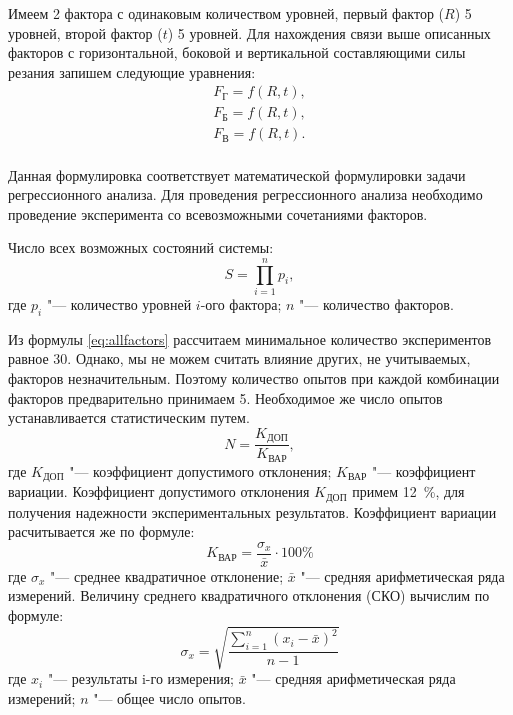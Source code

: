 Имеем 2 фактора с одинаковым количеством уровней, первый фактор ($R$) 5 уровней, второй фактор ($t$) 5 уровней. Для нахождения связи выше описанных факторов с горизонтальной, боковой и вертикальной составляющими силы резания запишем следующие уравнения:
\begin{equation}
\label{eq:regresF}
\begin{alignedat}{2}
	F_\text{Г}=f(R,t),\\
	F_\text{Б}=f(R,t),\\
	F_\text{В}=f(R,t).\\
\end{alignedat}
\end{equation}

Данная формулировка соответствует математической формулировки задачи регрессионного анализа. Для проведения регрессионного анализа необходимо проведение эксперимента со всевозможными сочетаниями факторов.

Число всех возможных состояний системы:
\begin{equation}
\label{eq:allfactors}
S=\prod_{i=1}^n p_i,
\end{equation}
где $ p_i $ "--- количество уровней $i$-ого фактора; 
	$ n $ "--- количество факторов.
	
Из формулы \ref{eq:allfactors} рассчитаем минимальное количество экспериментов равное 30. Однако, мы не можем считать влияние других, не учитываемых, факторов незначительным. Поэтому количество опытов при каждой комбинации факторов предварительно принимаем 5. Необходимое же число опытов устанавливается статистическим путем.
\begin{equation}
\label{eq:nexpr}
N=\frac{K_{\text{ДОП}}}{K_{\text{ВАР}}},
\end{equation}
где $ K_{\text{ДОП}} $ "--- коэффициент допустимого отклонения;
	$ K_{\text{ВАР}} $ "--- коэффициент вариации.
Коэффициент допустимого отклонения $ K_{\text{ДОП}} $ примем 12~\%, для получения надежности экспериментальных результатов.
Коэффициент вариации расчитывается же по формуле:
\begin{equation}
\label{eq:var}
K_{\text{ВАР}}=\frac{\sigma_x}{\bar{x}}\cdot100\%
\end{equation}
где $ \sigma_x $ "--- среднее квадратичное отклонение;
	$ \bar{x} $ "--- средняя арифметическая ряда измерений.
Величину среднего квадратичного отклонения (СКО) вычислим по формуле:
\begin{equation}
\label{eq:sigma_x}
\sigma_x=\sqrt{\frac{\sum_{i=1}^n (x_i-\bar{x})^2}{n-1}}
\end{equation}
где $ x_i $ "--- результаты i-го измерения;
	$ \bar{x} $ "--- средняя арифметическая ряда измерений;
	$ n $ "--- общее число опытов.

